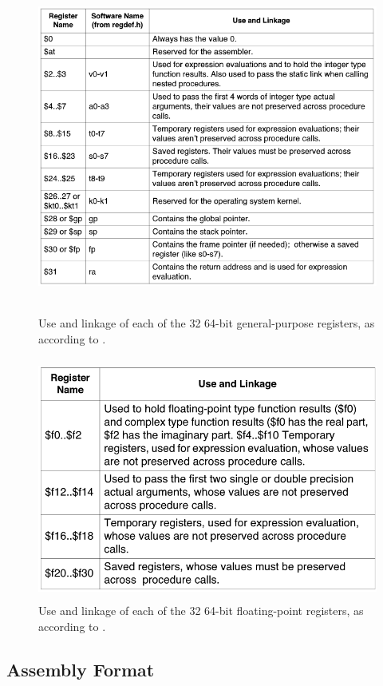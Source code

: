 \documentclass[
    paper=letter,
    parskip=half,
    fontsize=12pt,
    titlepage=firstiscover,
    toc=bibliography,
    numbers=endperiod
]{scrartcl}
\begin{document}
\begin{figure}[H]
    \includegraphics[height=11cm]{gpr-names}
    \caption{Use and linkage of each of the 32 64-bit general-purpose registers, as according to \protect\cite[Table~1-1]{mips-programmers-guide}.}
\end{figure}

\begin{figure}[H]
    \includegraphics[height=8cm]{fpr-names}
    \caption{Use and linkage of each of the 32 64-bit floating-point
        registers, as according to \protect\cite[Table~1-3]{mips-programmers-guide}.}
\end{figure}

\subsection{Assembly Format}
\end{document}
